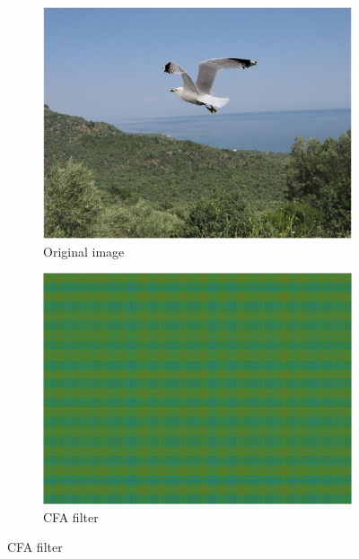 \documentclass{template/acm_proc_article-sp}
\begin{document}
\begin{figure}
\centering

\begin{subfigure}{0.23\textwidth}
    \includegraphics[trim=0 0 0 0,clip,width=\linewidth]{report/results/f1_steps_0.jpg}
    \caption{Original image}
\end{subfigure}
\hspace*{\fill}
\begin{subfigure}{0.23\textwidth}
    \includegraphics[trim=0 0 0 0,clip,width=\linewidth]{report/results/f1_steps_1.jpg}
    \caption{CFA filter}
\end{subfigure}


\end{figure}
\end{document}
